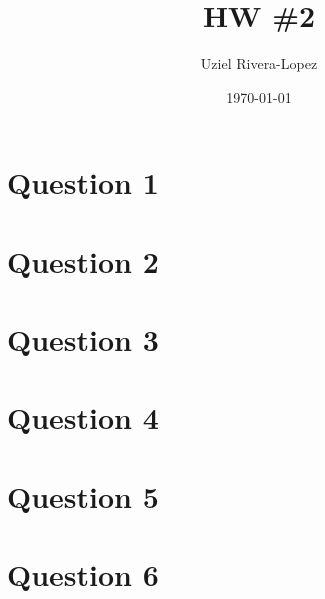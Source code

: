 \documentclass[12pt]{article}
\title{HW \#2}
\author{
    Uziel Rivera-Lopez
}
\date{\today}
\begin{document}
\maketitle
\section*{Question 1}
\section*{Question 2}
\section*{Question 3}
\section*{Question 4}
\section*{Question 5}
\section*{Question 6}
\end{document}
